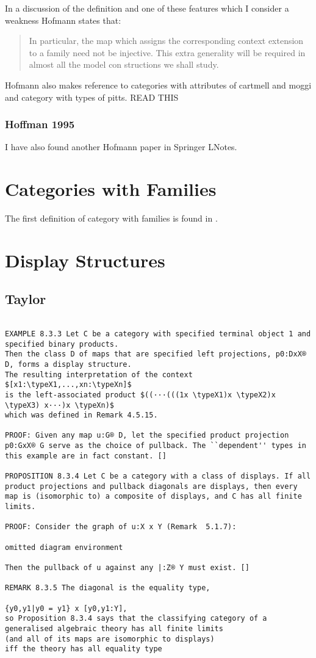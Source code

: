 \documentclass[14pt,a4paper]{scrartcl}
\begin{document}
\noindent
In a discussion of the definition and one of these features which I consider a weakness Hofmann states that:
\begin{quote}
In particular, 
the map which assigns the corresponding context extension to a family need not 
be injective. This extra generality will be required in almost all the model con­ 
structions we shall study. 
\end{quote}

Hofmann also makes reference to categories with attributes of cartmell and moggi and category with types of pitts.
READ THIS 

\subsubsection{Hoffman 1995}
I have also found another Hofmann paper \cite{hofmann95} in Springer LNotes.

\section{Categories with Families}

The first definition of category with families is found in \cite{dybjer96}.

\section{Display Structures}
\subsection{Taylor}
\begin{verbatim}

EXAMPLE 8.3.3 Let C be a category with specified terminal object 1 and specified binary products. 
Then the class D of maps that are specified left projections, p0:DxX® D, forms a display structure. 
The resulting interpretation of the context $[x1:\typeX1,...,xn:\typeXn]$
is the left-associated product $((···(((1x \typeX1)x \typeX2)x \typeX3) x···)x \typeXn)$
which was defined in Remark 4.5.15.

PROOF: Given any map u:G® D, let the specified product projection p0:GxX® G serve as the choice of pullback. The ``dependent'' types in this example are in fact constant. []

PROPOSITION 8.3.4 Let C be a category with a class of displays. If all product projections and pullback diagonals are displays, then every map is (isomorphic to) a composite of displays, and C has all finite limits.

PROOF: Consider the graph of u:X x Y (Remark  5.1.7):

omitted diagram environment

Then the pullback of u against any |:Z® Y must exist. []

REMARK 8.3.5 The diagonal is the equality type,

{y0,y1|y0 = y1} x [y0,y1:Y],
so Proposition 8.3.4 says that the classifying category of a 
generalised algebraic theory has all finite limits 
(and all of its maps are isomorphic to displays) 
iff the theory has all equality type
\end{verbatim}
\end{document}
